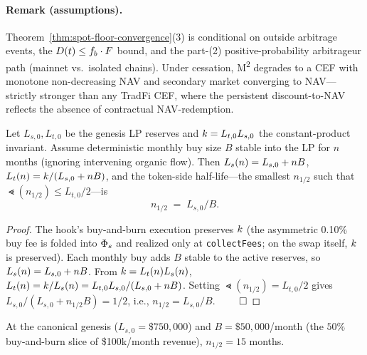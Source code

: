 \paragraph{Remark (assumptions).} Theorem~\ref{thm:spot-floor-convergence}(3) is conditional on outside arbitrage events, the $D(t) \leq f_b \cdot F$ bound, and the part-(2) positive-probability arbitrageur path (mainnet vs.\ isolated chains). Under cessation, M\textsuperscript{2} degrades to a CEF with monotone non-decreasing NAV and secondary market converging to NAV---strictly stronger than any TradFi CEF, where the persistent discount-to-NAV \citep{LeeShleiferThaler1991,Pontiff1996} reflects the absence of contractual NAV-redemption.

\begin{theorem}
\label{thm:lp-half-life}
Let $L_{s,0}, L_{t,0}$ be the genesis LP reserves and $k = L_{t,0} L_{s,0}$ the constant-product invariant. Assume deterministic monthly buy size $B$ stable into the LP for $n$ months (ignoring intervening organic flow). Then $L_s(n) = L_{s,0} + nB$, $L_t(n) = k/(L_{s,0} + nB)$, and the token-side half-life---the smallest $n_{1/2}$ such that $\Lt(n_{1/2}) \leq L_{t,0}/2$---is
\begin{equation}
n_{1/2} \;=\; L_{s,0} / B.
\label{eq:lp-half-life}
\end{equation}
\end{theorem}

\begin{proof}
The hook's buy-and-burn execution preserves $k$ (the asymmetric 0.10\% buy fee is folded into $\Phi_s$ and realized only at \texttt{collectFees}; on the swap itself, $k$ is preserved). Each monthly buy adds $B$ stable to the active reserves, so $L_s(n) = L_{s,0} + nB$. From $k = L_t(n) L_s(n)$, $L_t(n) = k/L_s(n) = L_{t,0} L_{s,0}/(L_{s,0} + nB)$. Setting $\Lt(n_{1/2}) = L_{t,0}/2$ gives $L_{s,0}/(L_{s,0} + n_{1/2} B) = 1/2$, i.e., $n_{1/2} = L_{s,0}/B$. $\qed$
\end{proof}

At the canonical genesis ($L_{s,0} = \$750{,}000$) and $B = \$50{,}000$/month (the $50\%$ buy-and-burn slice of \$100k/month revenue), $n_{1/2} = 15$ months.

